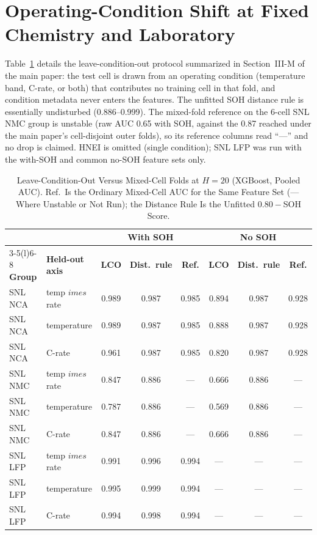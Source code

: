 \documentclass[11pt,a4paper]{article}
\begin{document}
\section{Operating-Condition Shift at Fixed Chemistry and Laboratory}
Table~\ref{tab:s_cond} details the leave-condition-out protocol summarized in Section~III-M of the main paper: the test cell is drawn from an operating condition (temperature band, C-rate, or both) that contributes no training cell in that fold, and condition metadata never enters the features. The unfitted SOH distance rule is essentially undisturbed (0.886--0.999). The mixed-fold reference on the 6-cell SNL NMC group is unstable (raw AUC 0.65 with SOH, against the 0.87 reached under the main paper's cell-disjoint outer folds), so its reference columns read ``---'' and no drop is claimed. HNEI is omitted (single condition); SNL LFP was run with the with-SOH and common no-SOH feature sets only.
\begin{table}[!htbp]
\caption{Leave-Condition-Out Versus Mixed-Cell Folds at $H{=}20$ (XGBoost, Pooled AUC). Ref.\ Is the Ordinary Mixed-Cell AUC for the Same Feature Set (--- Where Unstable or Not Run); the Distance Rule Is the Unfitted $0.80-$SOH Score.}
\label{tab:s_cond}
\centering\footnotesize\setlength{\tabcolsep}{4pt}
\begin{tabular}{llcccccc}
\toprule
 & & \multicolumn{3}{c}{\textbf{With SOH}} & \multicolumn{3}{c}{\textbf{No SOH}}\\
\cmidrule(lr){3-5}\cmidrule(l){6-8}
\textbf{Group} & \textbf{Held-out axis} & \textbf{LCO} & \textbf{Dist.\ rule} & \textbf{Ref.} & \textbf{LCO} & \textbf{Dist.\ rule} & \textbf{Ref.}\\
\midrule
SNL NCA & temp $	imes$ rate & 0.989 & 0.987 & 0.985 & 0.894 & 0.987 & 0.928\\
SNL NCA & temperature & 0.989 & 0.987 & 0.985 & 0.888 & 0.987 & 0.928\\
SNL NCA & C-rate & 0.961 & 0.987 & 0.985 & 0.820 & 0.987 & 0.928\\
SNL NMC & temp $	imes$ rate & 0.847 & 0.886 & --- & 0.666 & 0.886 & ---\\
SNL NMC & temperature & 0.787 & 0.886 & --- & 0.569 & 0.886 & ---\\
SNL NMC & C-rate & 0.847 & 0.886 & --- & 0.666 & 0.886 & ---\\
SNL LFP & temp $	imes$ rate & 0.991 & 0.996 & 0.994 & --- & --- & ---\\
SNL LFP & temperature & 0.995 & 0.999 & 0.994 & --- & --- & ---\\
SNL LFP & C-rate & 0.994 & 0.998 & 0.994 & --- & --- & ---\\
\bottomrule
\end{tabular}
\end{table}
\end{document}
